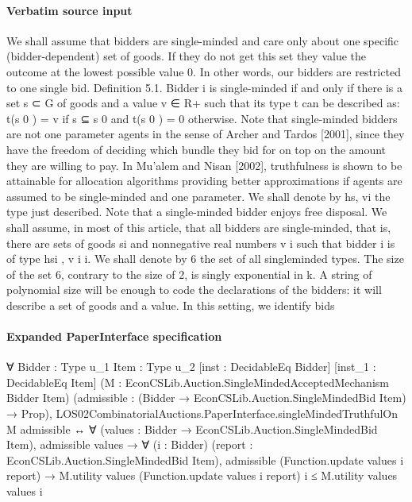 \documentclass[10pt]{article}
\begin{document}
\paragraph{Verbatim source input}
\begin{ReviewVerbatim}
We shall assume that bidders are single-minded and care only about one specific
(bidder-dependent) set of goods. If they do not get this set they value the outcome
at the lowest possible value 0. In other words, our bidders are restricted to one
single bid.
Definition 5.1. Bidder i is single-minded if and only if there is a set s ⊂ G of
goods and a value v ∈ R+ such that its type t can be described as: t(s 0 ) = v if s ⊆ s 0
and t(s 0 ) = 0 otherwise.
Note that single-minded bidders are not one parameter agents in the sense
of Archer and Tardos [2001], since they have the freedom of deciding which bundle
they bid for on top on the amount they are willing to pay. In Mu’alem and Nisan
[2002], truthfulness is shown to be attainable for allocation algorithms providing
better approximations if agents are assumed to be single-minded and one parameter. We shall denote by hs, vi the type just described. Note that a single-minded
bidder enjoys free disposal. We shall assume, in most of this article, that all bidders
are single-minded, that is, there are sets of goods si and nonnegative real numbers
v i such that bidder i is of type hsi , v i i. We shall denote by 6 the set of all singleminded types. The size of the set 6, contrary to the size of 2, is singly exponential
in k. A string of polynomial size will be enough to code the declarations of the
bidders: it will describe a set of goods and a value. In this setting, we identify bids
\end{ReviewVerbatim}


\paragraph{Expanded PaperInterface specification}
\begin{ReviewVerbatim}
∀ {Bidder : Type u_1} {Item : Type u_2} [inst : DecidableEq Bidder] [inst_1 : DecidableEq Item]
  (M : EconCSLib.Auction.SingleMindedAcceptedMechanism Bidder Item)
  (admissible : (Bidder → EconCSLib.Auction.SingleMindedBid Item) → Prop),
  LOS02CombinatorialAuctions.PaperInterface.singleMindedTruthfulOn M admissible ↔
    ∀ (values : Bidder → EconCSLib.Auction.SingleMindedBid Item),
      admissible values →
        ∀ (i : Bidder) (report : EconCSLib.Auction.SingleMindedBid Item),
          admissible (Function.update values i report) →
            M.utility values (Function.update values i report) i ≤ M.utility values values i
\end{ReviewVerbatim}
\end{document}

